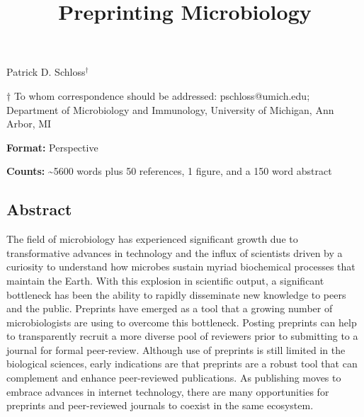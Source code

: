 \documentclass[11,]{article}
\title{\textbf{Preprinting Microbiology}}
\author{}
\date{}
\begin{document}
\maketitle


\begin{center}
\vspace{25mm}
Patrick D. Schloss${^\dagger}$

\vspace{30mm}

$\dagger$ To whom correspondence should be addressed: pschloss@umich.edu; Department of Microbiology and Immunology, University of Michigan, Ann Arbor, MI

\vspace{10mm}

\textbf{Format:} Perspective

\textbf{Counts:} \textasciitilde5600 words plus 50 references, 1 figure, and a 150 word abstract

\end{center}

\newpage
\linenumbers

\subsection{Abstract}\label{abstract}

The field of microbiology has experienced significant growth due to
transformative advances in technology and the influx of scientists
driven by a curiosity to understand how microbes sustain myriad
biochemical processes that maintain the Earth. With this explosion in
scientific output, a significant bottleneck has been the ability to
rapidly disseminate new knowledge to peers and the public. Preprints
have emerged as a tool that a growing number of microbiologists are
using to overcome this bottleneck. Posting preprints can help to
transparently recruit a more diverse pool of reviewers prior to
submitting to a journal for formal peer-review. Although use of
preprints is still limited in the biological sciences, early indications
are that preprints are a robust tool that can complement and enhance
peer-reviewed publications. As publishing moves to embrace advances in
internet technology, there are many opportunities for preprints and
peer-reviewed journals to coexist in the same ecosystem.

\newpage
\end{document}
